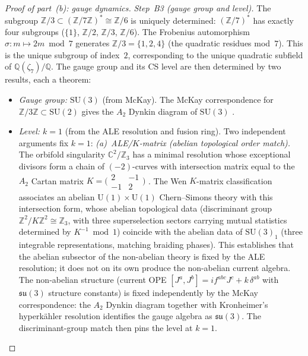 \begin{proof}[Proof of part~(b): gauge dynamics]
\emph{Step~B3 (gauge group and level).}
The subgroup $\mathbb{Z}/3 \subset (\mathbb{Z}/7\mathbb{Z})^*
\cong \mathbb{Z}/6$ is uniquely determined:
$(\mathbb{Z}/7)^*$ has exactly four subgroups
($\{1\}$, $\mathbb{Z}/2$, $\mathbb{Z}/3$, $\mathbb{Z}/6$).
The Frobenius automorphism $\sigma\colon m \mapsto 2m \bmod 7$
generates $\mathbb{Z}/3 = \{1, 2, 4\}$
(the quadratic residues mod~$7$).
This is the unique subgroup of index~$2$, corresponding
to the unique quadratic subfield of
$\mathbb{Q}(\zeta_7)/\mathbb{Q}$.
The gauge group and its CS level are then determined by
two results, each a theorem:
\begin{itemize}
\item \emph{Gauge group: $\mathrm{SU}(3)$} (from McKay).
  The McKay correspondence for
  $\mathbb{Z}/3\mathbb{Z} \subset \mathrm{SU}(2)$
  gives the $A_2$ Dynkin diagram of $\mathrm{SU}(3)$
  \citep{McKay1980,GonzalezSprinberg1983}.
\item \emph{Level: $k = 1$} (from the ALE resolution
  and fusion ring).
  Two independent arguments fix $k = 1$:
  \emph{(a)~ALE/$K$-matrix (abelian topological order match).}
  The orbifold singularity $\mathbb{C}^2/\mathbb{Z}_3$ has
  a minimal resolution whose exceptional divisors form a
  chain of $(-2)$-curves with intersection matrix equal to
  the $A_2$ Cartan matrix
  $K = \bigl(\begin{smallmatrix} 2 & -1 \\ -1 & 2
  \end{smallmatrix}\bigr)$
  \citep{Kronheimer1989}.
  The Wen $K$-matrix classification \citep{Wen1995} associates
  an abelian $\mathrm{U}(1) \times \mathrm{U}(1)$ Chern--Simons
  theory with this intersection form, whose abelian topological
  data (discriminant group
  $\mathbb{Z}^2/K\mathbb{Z}^2 \cong \mathbb{Z}_3$, with three
  superselection sectors carrying mutual statistics determined
  by $K^{-1} \bmod 1$) coincide with the abelian data of
  $\mathrm{SU}(3)_1$ (three integrable representations, matching
  braiding phases).  This establishes that the abelian subsector
  of the non-abelian theory is fixed by the ALE resolution; it
  does not on its own produce the non-abelian current algebra.
  The non-abelian structure (current OPE
  $[J^a, J^b] = if^{abc}J^c + k\,\delta^{ab}$ with
  $\mathfrak{su}(3)$ structure constants) is fixed independently
  by the McKay correspondence: the $A_2$ Dynkin diagram together
  with Kronheimer's hyperk\"ahler resolution identifies the gauge
  algebra as $\mathfrak{su}(3)$.  The discriminant-group match
  then pins the level at $k = 1$.

\end{itemize}
\end{proof}
